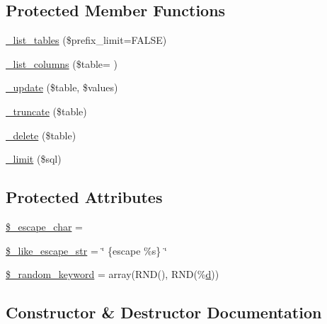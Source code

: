 \subsection*{Protected Member Functions}
\begin{DoxyCompactItemize}
\item 
\hyperlink{class_c_i___d_b__pdo__odbc__driver_a435c0f3ce54fe7daa178baa8532ebd54}{\+\_\+list\+\_\+tables} (\$prefix\+\_\+limit=F\+A\+L\+S\+E)
\item 
\hyperlink{class_c_i___d_b__pdo__odbc__driver_a2a81bb476a5c76fe6f763b0557c1e4c2}{\+\_\+list\+\_\+columns} (\$table= \textquotesingle{}\textquotesingle{})
\item 
\hyperlink{class_c_i___d_b__pdo__odbc__driver_a2540b03a93fa73ae74c10d0e16fc073e}{\+\_\+update} (\$table, \$values)
\item 
\hyperlink{class_c_i___d_b__pdo__odbc__driver_aa029600528fc1ce660a23ff4b4667f95}{\+\_\+truncate} (\$table)
\item 
\hyperlink{class_c_i___d_b__pdo__odbc__driver_a133ea8446ded52589bd22cc9163d0896}{\+\_\+delete} (\$table)
\item 
\hyperlink{class_c_i___d_b__pdo__odbc__driver_a3a02ea06541b8ecc25a33a61651562c8}{\+\_\+limit} (\$sql)
\end{DoxyCompactItemize}
\subsection*{Protected Attributes}
\begin{DoxyCompactItemize}
\item 
\hyperlink{class_c_i___d_b__pdo__odbc__driver_aaec2fb0112850159063a8e47ad3aed6e}{\$\+\_\+escape\+\_\+char} = \textquotesingle{}\textquotesingle{}
\item 
\hyperlink{class_c_i___d_b__pdo__odbc__driver_adf86ecadf3d0e1ce3f5e0eaeeb3867ae}{\$\+\_\+like\+\_\+escape\+\_\+str} = \char`\"{} \{escape \textquotesingle{}\%s\textquotesingle{}\} \char`\"{}
\item 
\hyperlink{class_c_i___d_b__pdo__odbc__driver_a10213aa6e05f6d924d3277bb1d2fea00}{\$\+\_\+random\+\_\+keyword} = array(\textquotesingle{}R\+N\+D()\textquotesingle{}, \textquotesingle{}R\+N\+D(\%\hyperlink{jquery_8canvasjs_8min_8js_a36541169dfff685f807208881a4f0021}{d})\textquotesingle{})
\end{DoxyCompactItemize}


\subsection{Constructor \& Destructor Documentation}
\hypertarget{class_c_i___d_b__pdo__odbc__driver_a9162320adff1a1a4afd7f2372f753a3e}{}
